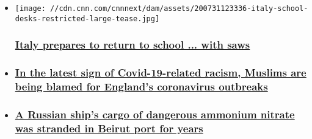 \begin{itemize}
\item
  \href{/2020/08/07/europe/italy-school-return-sawing-up-desks-coronavirus-intl/index.html}{}

  \texttt{[image: //cdn.cnn.com/cnnnext/dam/assets/200731123336-italy-school-desks-restricted-large-tease.jpg]}

  \hypertarget{italy-prepares-to-return-to-school--with-saws}{%
  \subsubsection{\texorpdfstring{\href{/2020/08/07/europe/italy-school-return-sawing-up-desks-coronavirus-intl/index.html}{Italy
  prepares to return to school ... with
  saws}}{Italy prepares to return to school ... with saws}}\label{italy-prepares-to-return-to-school--with-saws}}
\item
  \hypertarget{in-the-latest-sign-of-covid-19-related-racism-muslims-are-being-blamed-for-englands-coronavirus-outbreaks}{%
  \subsubsection{\texorpdfstring{\href{/2020/08/06/europe/muslims-coronavirus-england-islamophobia-gbr-intl/index.html}{In
  the latest sign of Covid-19-related racism, Muslims are being blamed
  for England's coronavirus
  outbreaks}}{In the latest sign of Covid-19-related racism, Muslims are being blamed for England's coronavirus outbreaks}}\label{in-the-latest-sign-of-covid-19-related-racism-muslims-are-being-blamed-for-englands-coronavirus-outbreaks}}
\item
  \hypertarget{a-russian-ships-cargo-of-dangerous-ammonium-nitrate-was-stranded-in-beirut-port-for-years}{%
  \subsubsection{\texorpdfstring{\href{/2020/08/05/europe/lebanon-russian-ship-blast-intl/index.html}{A
  Russian ship's cargo of dangerous ammonium nitrate was stranded in
  Beirut port for
  years}}{A Russian ship's cargo of dangerous ammonium nitrate was stranded in Beirut port for years}}\label{a-russian-ships-cargo-of-dangerous-ammonium-nitrate-was-stranded-in-beirut-port-for-years}}
\end{itemize}

